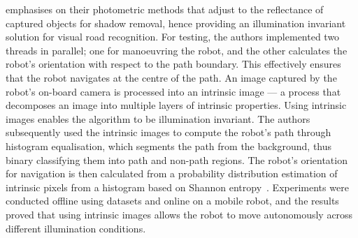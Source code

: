 emphasises on their photometric methods that adjust to the reflectance of captured objects for shadow removal, hence providing an illumination invariant solution for visual road recognition. For testing, the authors implemented two threads in parallel; one for manoeuvring the robot, and the other calculates the robot's orientation with respect to the path boundary. This effectively ensures that the robot navigates at the centre of the path. An image captured by the robot's on-board camera is processed into an intrinsic image --- a process that decomposes an image into multiple layers of intrinsic properties. Using intrinsic images enables the algorithm to be illumination invariant. The authors subsequently used the intrinsic images to compute the robot's path through histogram equalisation, which segments the path from the background, thus binary classifying them into path and non-path regions. The robot's orientation for navigation is then calculated from a probability distribution estimation of intrinsic pixels from a histogram based on Shannon entropy~\cite{c._e._shannon_mathematical_1948}. Experiments were conducted offline using datasets and online on a mobile robot, and the results proved that using intrinsic images allows the robot to move autonomously across different illumination conditions.



